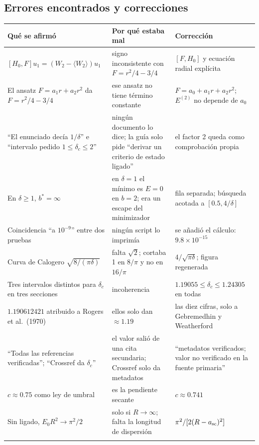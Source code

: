 \documentclass[11pt]{article}
\newcommand{\dc}{\delta_c}
\begin{document}
\subsection{Errores encontrados y correcciones}

\begin{longtable}{@{}L{3.6cm}L{5.0cm}L{4.9cm}@{}}
\toprule
\textbf{Qué se afirmó} & \textbf{Por qué estaba mal} & \textbf{Corrección}\\
\midrule
\endhead
$[H_0,F]u_1=(W_2-\langle W_2\rangle)u_1$ & signo inconsistente con $F=r^2/4-3/4$ & $[F,H_0]$ y ecuación radial explícita\\
\addlinespace
El ansatz $F=a_1r+a_2r^2$ da $F=r^2/4-3/4$ & ese ansatz no tiene término constante & $F=a_0+a_1r+a_2r^2$; $E^{(2)}$ no depende de $a_0$\\
\addlinespace
``El enunciado decía $1/\delta$'' e ``intervalo pedido $1\le\dc\le2$'' & ningún documento lo dice; la guía solo pide ``derivar un criterio de estado ligado'' & el factor 2 queda como comprobación propia\\
\addlinespace
En $\delta\ge1$, $b^*=\infty$ & en $\delta=1$ el mínimo es $E=0$ en $b=2$; era un escape del minimizador & fila separada; búsqueda acotada a $[0.5,4/\delta]$\\
\addlinespace
Coincidencia ``a $10^{-9}$'' entre dos pruebas & ningún script lo imprimía & se añadió el cálculo: $9.8\times10^{-15}$\\
\addlinespace
Curva de Calogero $\sqrt{8/(\pi\delta)}$ & falta $\sqrt2$; cortaba 1 en $8/\pi$ y no en $16/\pi$ & $4/\sqrt{\pi\delta}$; figura regenerada\\
\addlinespace
Tres intervalos distintos para $\dc$ en tres secciones & incoherencia & $1.19055\le\dc\le1.24305$ en todas\\
\addlinespace
$1.190612421$ atribuido a Rogers et al.\ (1970) & ellos solo dan $\approx1.19$ & las diez cifras, solo a Gebremedhin y Weatherford\\
\addlinespace
``Todas las referencias verificadas''; ``Crossref da $\dc$'' & el valor salió de una cita secundaria; Crossref solo da metadatos & ``metadatos verificados; valor no verificado en la fuente primaria''\\
\addlinespace
$c\approx0.75$ como ley de umbral & es la pendiente secante & $c\approx0.741$\\
\addlinespace
Sin ligado, $E_0R^2\to\pi^2/2$ & solo si $R\to\infty$; falta la longitud de dispersión & $\pi^2/[2(R-a_{\rm sc})^2]$\\
\addlinespace

\end{longtable}
\end{document}
